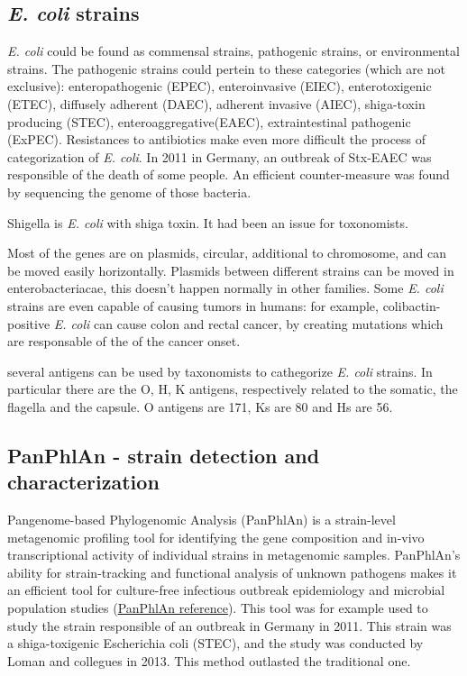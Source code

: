 \subsection{\emph{E. coli} strains}
\emph{E. coli} could be found as commensal strains, pathogenic strains, or environmental strains. The pathogenic strains could pertein to these categories (which are not exclusive): enteropathogenic (EPEC), enteroinvasive (EIEC), enterotoxigenic (ETEC), diffusely adherent (DAEC), adherent invasive (AIEC), shiga-toxin producing (STEC), enteroaggregative(EAEC), extraintestinal pathogenic (ExPEC). Resistances to antibiotics make even more difficult the process of categorization of \emph{E. coli}. 
In 2011 in Germany, an outbreak of Stx-EAEC was responsible of the death of some people. An efficient counter-measure was found by sequencing the genome of those bacteria. 

Shigella is \emph{E. coli} with shiga toxin. It had been an issue for toxonomists.

Most of the genes are on plasmids, circular, additional to chromosome, and can be moved easily horizontally. Plasmids between different strains can be moved in enterobacteriacae, this doesn't happen normally in other families.
Some \emph{E. coli} strains are even capable of causing tumors in humans: for example, colibactin-positive \emph{\emph{E. coli}} can cause colon and rectal cancer, by creating mutations which are responsable of the of the cancer onset.

several antigens can be used by taxonomists to cathegorize \emph{E. coli} strains. In particular there are the O, H, K antigens, respectively related to the somatic, the flagella and the capsule. O antigens are 171, Ks are 80 and Hs are 56.

\subsection{PanPhlAn - strain detection and characterization}

Pangenome-based Phylogenomic Analysis (PanPhlAn) is a strain-level metagenomic profiling tool
for identifying the gene composition and in-vivo transcriptional activity of individual strains in metagenomic samples. PanPhlAn’s ability for strain-tracking and functional analysis of unknown pathogens makes it an efficient tool for culture-free infectious outbreak epidemiology and microbial population studies (\href{http://segatalab.cibio.unitn.it/tools/panphlan/}{PanPhlAn reference}). This tool was for example used to study the strain responsible of an outbreak in Germany in 2011. This strain was a shiga-toxigenic Escherichia coli (STEC), and the study was conducted by Loman and collegues in 2013.
This method outlasted the traditional one.


